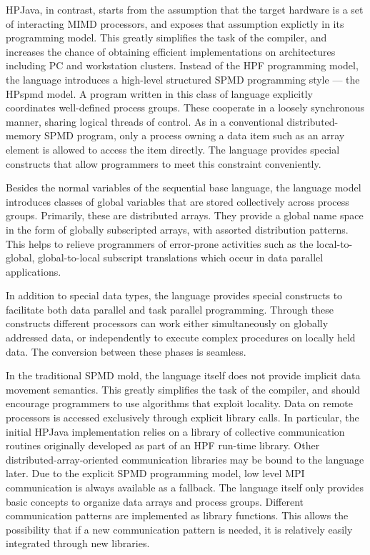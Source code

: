 HPJava, in contrast, starts from the assumption that the target
hardware is a set of interacting MIMD processors, and exposes that
assumption explictly in its programming model.  This greatly
simplifies the task of the compiler, and increases the chance of
obtaining efficient implementations on architectures including PC and
workstation clusters.  Instead of the HPF programming model, the
language introduces a high-level structured SPMD programming
style --- the  HPspmd model.  A program written in
this class of language explicitly coordinates well-defined process
groups.  These cooperate in a loosely synchronous manner, sharing
logical threads of control.  As in a conventional distributed-memory
SPMD program, only a process owning a data item such as an array
element is allowed to access the item directly.  The language provides
special constructs that allow programmers to meet this constraint
conveniently.

Besides the normal variables of the sequential base language, the
language model introduces classes of global variables that are stored
collectively across process groups.  Primarily, these are
distributed arrays.  They provide a global name space in the form of
globally subscripted arrays, with assorted distribution patterns.  This
helps to relieve programmers of error-prone activities such as the
local-to-global, global-to-local subscript translations which occur in
data parallel applications.

In addition to special data types, the language provides special
constructs to facilitate both data parallel and task parallel
programming.  Through these constructs different processors can work either
simultaneously on globally addressed data, or independently to execute
complex procedures on locally held data.  The conversion between these
phases is seamless.

In the traditional SPMD mold, the language itself does not provide
implicit data movement semantics.  This greatly simplifies the task of
the compiler, and should encourage programmers to use algorithms that
exploit locality.  Data on remote processors is accessed exclusively
through explicit library calls.  In particular, the initial HPJava
implementation relies on a library of collective communication
routines originally developed as part of an HPF run-time library.
Other distributed-array-oriented communication libraries may be
bound to the language later.  Due to the explicit SPMD programming
model, low level MPI communication is always available as a fallback.
The language itself only provides basic concepts to organize data
arrays and process groups.  Different communication patterns are
implemented as library functions.  This allows the possibility that if
a new communication pattern is needed, it is relatively easily
integrated through new libraries.

